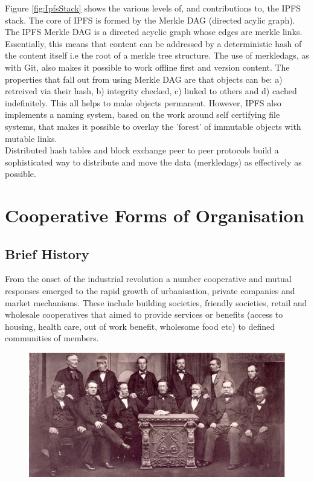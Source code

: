 Figure \ref{fig:IpfsStack} shows the various levels of, and contributions to, the IPFS stack. The core of IPFS is formed by the Merkle DAG (directed acylic graph). The IPFS Merkle DAG is a directed acyclic graph whose edges are merkle links. Essentially, this means that content can be addressed by a deterministic hash of the content itself i.e the root of a merkle tree structure. The use of merkledags, as with Git, also makes it possible to work offline first and version content. The properties that fall out from using Merkle DAG are that objects can be: a) retreived via their hash, b) integrity checked, c) linked to others and d) cached indefinitely. This all helps to make objects permanent. However, IPFS also implements a naming system, based on the work around self certifying file systems, that makes it possible to overlay the 'forest' of immutable objects with mutable links.\\ 

Distributed hash tables and block exchange peer to peer protocols build a sophisticated way to distribute and move the data (merkledags) as effectively as possible.

\section{Cooperative  Forms of Organisation}
\subsection{Brief History}
From the onset of  the industrial revolution a number cooperative and mutual responses emerged to the rapid growth of urbanisation, private companies and market mechanisms.  These include building societies, friendly societies, retail and wholesale cooperatives that aimed to provide services or benefits (access to housing, health care, out of work benefit, wholesome food etc) to defined communities of members.\\

\begin{figure}
\centering
\includegraphics[width=\textwidth]{Figures/rochdale_pioneers}
\decoRule
\caption[]{}
\label{fig:pioneers}
\end{figure}

